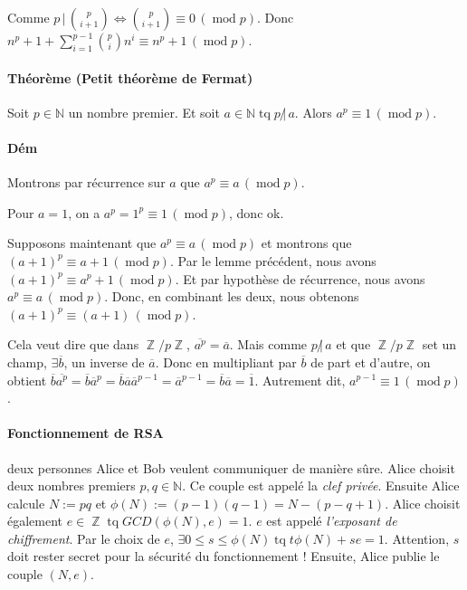 \documentclass{article}
\DeclareMathOperator{\tq}{\text{ tq }}
\DeclareMathOperator{\Z}{\mathbb Z}
\DeclareMathOperator{\modulo}{mod}
\newcommand{\cmod}[1]{\, (\modulo #1)}
\begin{document}
			Comme $p \, | \, \binom p{i+1} \Leftrightarrow \binom p{i+1} \equiv 0 \cmod p$. Donc $n^p + 1 + \sum_{i=1}^{p-1}\binom pi n^i \equiv n^p + 1 \cmod p$.
		 
			\paragraph{Théorème (Petit théorème de Fermat)} Soit $p \in \mathbb N$ un nombre premier. Et soit $a \in \mathbb N \tq p \, \not | \, a$.
			Alors $a^p \equiv 1 \cmod p$.
			
			\paragraph{Dém} Montrons par récurrence sur $a$ que $a^p \equiv a \cmod p$.
			
			Pour $a = 1$, on a $a^p = 1^p \equiv 1 \cmod p$, donc ok.
			
			Supposons maintenant que $a^p \equiv a \cmod p$ et montrons que $(a+1)^p \equiv a+1 \cmod p$. Par le lemme précédent, nous avons
			$(a+1)^p \equiv a^p + 1 \cmod p$.
			Et par hypothèse de récurrence, nous avons $a^p \equiv a \cmod p$. Donc, en combinant les deux, nous obtenons $(a+1)^p \equiv (a+1) \cmod p$.
			
			Cela veut dire que dans $\Z/p\Z$, $\overline{a^p} = \overline a$. Mais comme $p \, \not | \, a$ et que $\Z/p\Z$ set un champ, $\exists \overline b$, un inverse
			de $\overline a$. Donc en multipliant par $\overline b$ de part et d'autre, on obtient $\overline b \overline{a^p} = \overline b \overline{a}^p
			= \overline b \overline a \overline a^{p-1} = \overline a^{p-1} = \overline b \overline a = \overline 1$. Autrement dit, $a^{p-1} \equiv 1 \cmod p$.
			
			\paragraph{Fonctionnement de RSA} deux personnes Alice et Bob veulent communiquer de manière sûre. Alice choisit deux nombres premiers $p, q \in \mathbb N$.
			Ce couple est appelé la \textit{clef privée}. Ensuite Alice calcule $N := pq$ et $\phi(N) := (p-1)(q-1) = N - (p-q+1)$. Alice choisit également $e \in \Z \tq
			GCD(\phi(N), e) = 1$. $e$ est appelé \textit{l'exposant de chiffrement}. Par le choix de $e$, $\exists 0 \leq s \leq \phi(N) \tq t\phi(N) + se = 1$.
			Attention, $s$ doit rester secret pour la sécurité du fonctionnement ! Ensuite, Alice publie le couple $(N, e)$.
			
\end{document}
